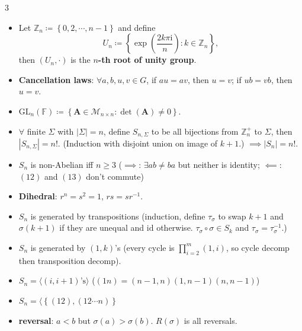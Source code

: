 \documentclass[10pt]{article}
\newcommand{\Z}{\mathbb{Z}} %
\newcommand{\abs}[1]{\left\lvert#1\right\rvert} %
\newcommand{\im}{\mathrm{i}}
\begin{document}
    \begin{multicols*}{3}
        \begin{itemize}
            \setlength\itemsep{2pt}
            \item Let $\Z_n \coloneqq \left\{0, 2, \cdots, n - 1\right\}$ and define 
            \begin{equation*}
                U_n \coloneqq \left\{\exp\left(\frac{2k\pi\im}{n}\right) \colon k \in \Z_n\right\},
            \end{equation*}
            then $\left(U_n, \cdot\right)$ is the \textbf{$n$-th root of unity group}.
            \item \textbf{Cancellation laws}: $\forall a, b, u, v \in G$, if $au = av$, then $u = v$; if $ub = vb$, then $u = v$.
            \item $\mathrm{GL}_n\left(\mathbb{F}\right) \coloneqq \left\{\bm{A} \in \mathcal{M}_{n \times n} \colon \det\left(\bm{A}\right) \neq 0\right\}$.
            \item $\forall$ finite $\Sigma$ with $\abs{\Sigma} = n$, define $S_{n, \Sigma}$ to be all bijections from $\Z_{n}^+$ to $\Sigma$, then $\abs{S_{n, \Sigma}} = n!$. (Induction with disjoint union on image of $k + 1$.) $\implies \abs{S_n} = n!$.
            \item $S_n$ is non-Abelian iff $n \geq 3$ ($\implies$: $\exists ab \neq ba$ but neither is identity; $\impliedby$: $\left(12\right)$ and $\left(13\right)$ don't commute)
            \item \textbf{Dihedral}: $r^n = s^2 = 1$, $rs = sr^{-1}$.
            \item $S_n$ is generated by transpositions (induction, define $\tau_{\sigma}$ to swap $k + 1$ and $\sigma\left(k + 1\right)$ if they are unequal and $\mathrm{id}$ otherwise. $\tau_{\sigma} \circ \sigma \in S_k$ and $\tau_{\sigma} = \tau_{\sigma}^{-1}$.)
            \item $S_n$ is generated by $\left(1, k\right)$'s (every cycle is $\prod_{i = 2}^m\left(1, i\right)$, so cycle decomp then transposition decomp).
            \item $S_n = \langle\left(i, i + 1\right)\textrm{'s}\rangle$ ($\left(1n\right) = \left(n - 1, n\right)\left(1, n - 1\right)\left(n, n - 1\right)$)
            \item $S_n = \langle\left\{\left(12\right), \left(12\cdots n\right)\right\}$
            \item \textbf{reversal}: $a < b$ but $\sigma\left(a\right) > \sigma\left(b\right)$. $R\left(\sigma\right)$ is all reversals.

\end{itemize}
\end{multicols*}
\end{document}
